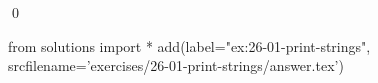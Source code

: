 
\begin{ex}
  \label{ex:26-01-print-strings}
  
  \qed
\end{ex}
\begin{python0}
from solutions import *
add(label="ex:26-01-print-strings",
    srcfilename='exercises/26-01-print-strings/answer.tex')
\end{python0}
